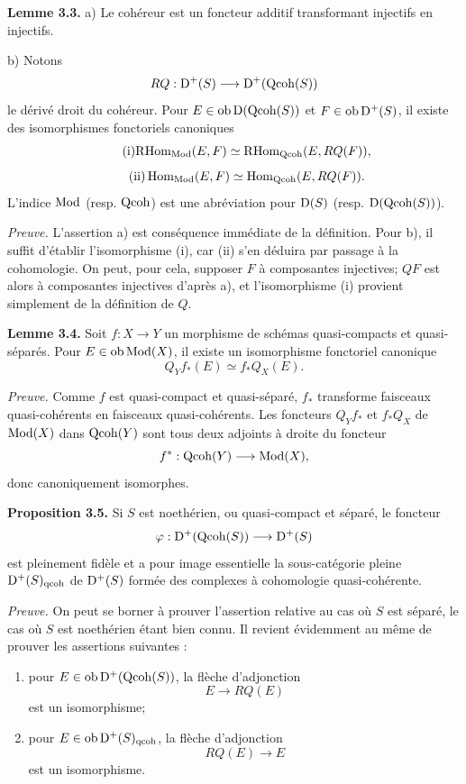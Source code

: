 \documentclass[11pt]{article}
\begin{document}
\textbf{Lemme 3.3.} a) Le cohéreur est un foncteur additif transformant injectifs en injectifs.

b) Notons
\[
RQ:\mathrm D^+(S)\longrightarrow\mathrm D^+(\operatorname{Qcoh}(S))
\]
le dérivé droit du cohéreur. Pour $E\in\operatorname{ob}\mathrm D(\operatorname{Qcoh}(S))$ et $F\in\operatorname{ob}\mathrm D^+(S)$, il existe des isomorphismes fonctoriels canoniques
\begin{equation}\tag{i}
\mathrm R\!\operatorname{Hom}_{\operatorname{Mod}}(E,F)\simeq \mathrm R\!\operatorname{Hom}_{\operatorname{Qcoh}}(E,RQ(F)),
\end{equation}
\begin{equation}\tag{ii}
\operatorname{Hom}_{\operatorname{Mod}}(E,F)\simeq \operatorname{Hom}_{\operatorname{Qcoh}}(E,RQ(F)).
\end{equation}
L'indice $\operatorname{Mod}$ (resp. $\operatorname{Qcoh}$) est une abréviation pour $\mathrm D(S)$ (resp. $\mathrm D(\operatorname{Qcoh}(S))$).

\emph{Preuve.} L'assertion a) est conséquence immédiate de la définition. Pour b), il suffit d'établir l'isomorphisme (i), car (ii) s'en déduira par passage à la cohomologie. On peut, pour cela, supposer $F$ à composantes injectives; $QF$ est alors à composantes injectives d'après a), et l'isomorphisme (i) provient simplement de la définition de $Q$.

\textbf{Lemme 3.4.} Soit $f:X\to Y$ un morphisme de schémas quasi-compacts et quasi-séparés. Pour $E\in\operatorname{ob}\operatorname{Mod}(X)$, il existe un isomorphisme fonctoriel canonique
\[
Q_Y f_*(E)\simeq f_*Q_X(E).
\]

\emph{Preuve.} Comme $f$ est quasi-compact et quasi-séparé, $f_*$ transforme faisceaux quasi-cohérents en faisceaux quasi-cohérents. Les foncteurs $Q_Y f_*$ et $f_*Q_X$ de $\operatorname{Mod}(X)$ dans $\operatorname{Qcoh}(Y)$ sont tous deux adjoints à droite du foncteur
\[
f^*:\operatorname{Qcoh}(Y)\longrightarrow\operatorname{Mod}(X),
\]
donc canoniquement isomorphes.

\textbf{Proposition 3.5.} Si $S$ est noethérien, ou quasi-compact et séparé, le foncteur
\[
\varphi:\mathrm D^+(\operatorname{Qcoh}(S))\longrightarrow\mathrm D^+(S)
\]
est pleinement fidèle et a pour image essentielle la sous-catégorie pleine $\mathrm D^+(S)_{\operatorname{qcoh}}$ de $\mathrm D^+(S)$ formée des complexes à cohomologie quasi-cohérente.

\emph{Preuve.} On peut se borner à prouver l'assertion relative au cas où $S$ est séparé, le cas où $S$ est noethérien étant bien connu. Il revient évidemment au même de prouver les assertions suivantes :
\begin{enumerate}[label=(3.5.\arabic*)]
\item pour $E\in\operatorname{ob}\mathrm D^+(\operatorname{Qcoh}(S))$, la flèche d'adjonction
\[
E\longrightarrow RQ(E)
\]
est un isomorphisme;
\item pour $E\in\operatorname{ob}\mathrm D^+(S)_{\operatorname{qcoh}}$, la flèche d'adjonction
\[
RQ(E)\longrightarrow E
\]
est un isomorphisme.
\end{enumerate}
\end{document}
